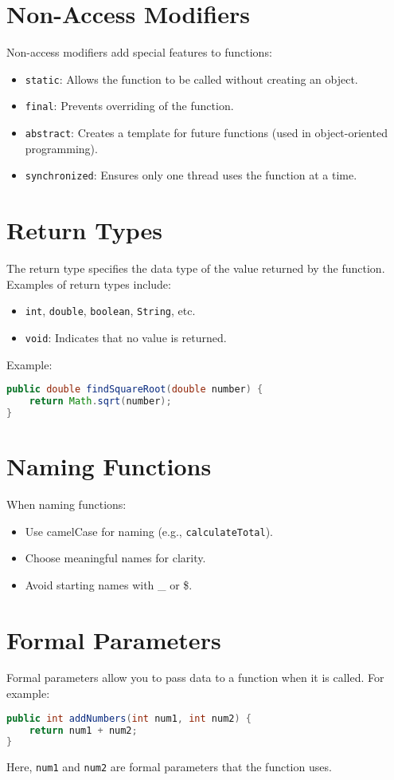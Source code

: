 \documentclass{article}
\begin{document}
\section{Non-Access Modifiers}
Non-access modifiers add special features to functions:
\begin{itemize}
    \item \texttt{static}: Allows the function to be called without creating an object.
    \item \texttt{final}: Prevents overriding of the function.
    \item \texttt{abstract}: Creates a template for future functions (used in object-oriented programming).
    \item \texttt{synchronized}: Ensures only one thread uses the function at a time.
\end{itemize}

\section{Return Types}
The return type specifies the data type of the value returned by the function. Examples of return types include:
\begin{itemize}
    \item \texttt{int}, \texttt{double}, \texttt{boolean}, \texttt{String}, etc.
    \item \texttt{void}: Indicates that no value is returned.
\end{itemize}

Example:
\begin{lstlisting}[language=java]
public double findSquareRoot(double number) {
    return Math.sqrt(number);
}
\end{lstlisting}

\section{Naming Functions}
When naming functions:
\begin{itemize}
    \item Use camelCase for naming (e.g., \texttt{calculateTotal}).
    \item Choose meaningful names for clarity.
    \item Avoid starting names with \_ or \$.
\end{itemize}

\section{Formal Parameters}
Formal parameters allow you to pass data to a function when it is called. For example:
\begin{lstlisting}[language=java]
public int addNumbers(int num1, int num2) {
    return num1 + num2;
}
\end{lstlisting}
Here, \texttt{num1} and \texttt{num2} are formal parameters that the function uses.
\end{document}
